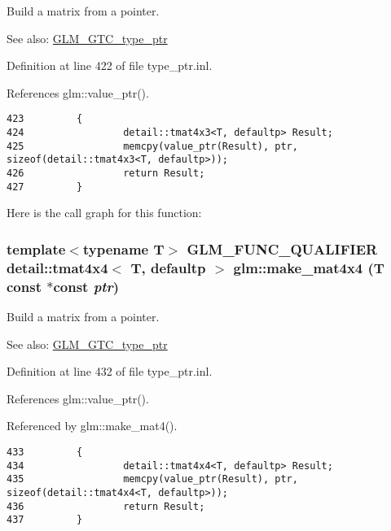 Build a matrix from a pointer. \begin{Desc}
\item[See also:]\hyperlink{group__gtc__type__ptr}{GLM\_\-GTC\_\-type\_\-ptr} \end{Desc}


Definition at line 422 of file type\_\-ptr.inl.

References glm::value\_\-ptr().

\begin{Code}\begin{verbatim}423         {
424                 detail::tmat4x3<T, defaultp> Result;
425                 memcpy(value_ptr(Result), ptr, sizeof(detail::tmat4x3<T, defaultp>));
426                 return Result;
427         }
\end{verbatim}
\end{Code}




Here is the call graph for this function:\hypertarget{group__gtc__type__ptr_g74e671ae9dc7e5e8f21aa44ea263d76e}{
\subsubsection[make\_\-mat4x4]{\setlength{\rightskip}{0pt plus 5cm}template$<$typename T$>$ GLM\_\-FUNC\_\-QUALIFIER detail::tmat4x4$<$ T, defaultp $>$ glm::make\_\-mat4x4 (T const $\ast$const  {\em ptr})}}
\label{group__gtc__type__ptr_g74e671ae9dc7e5e8f21aa44ea263d76e}


Build a matrix from a pointer. \begin{Desc}
\item[See also:]\hyperlink{group__gtc__type__ptr}{GLM\_\-GTC\_\-type\_\-ptr} \end{Desc}


Definition at line 432 of file type\_\-ptr.inl.

References glm::value\_\-ptr().

Referenced by glm::make\_\-mat4().

\begin{Code}\begin{verbatim}433         {
434                 detail::tmat4x4<T, defaultp> Result;
435                 memcpy(value_ptr(Result), ptr, sizeof(detail::tmat4x4<T, defaultp>));
436                 return Result;
437         }
\end{verbatim}
\end{Code}




